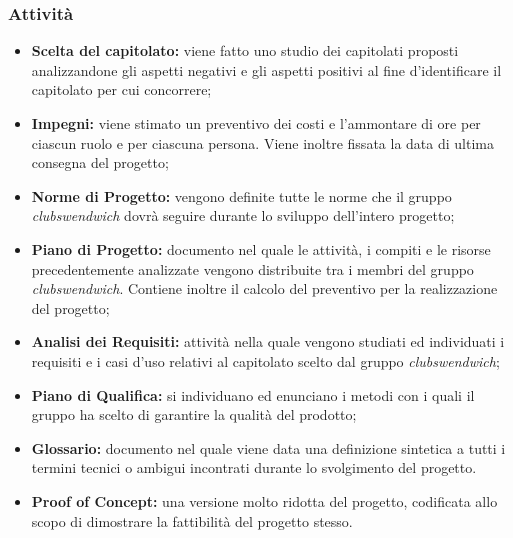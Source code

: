 \subsubsection{Attività}
\begin{itemize}
    \item \textbf{Scelta del capitolato:} viene fatto uno studio dei capitolati proposti analizzandone gli aspetti negativi e gli aspetti positivi al fine d'identificare il capitolato per cui concorrere;
    \item \textbf{Impegni:} viene stimato un preventivo dei costi e l'ammontare di ore per ciascun ruolo e per ciascuna persona. Viene inoltre fissata la data di ultima consegna del progetto;
    \item \textbf{Norme di Progetto:} vengono definite tutte le norme che il gruppo \textit{clubswendwich} dovrà seguire durante lo sviluppo dell'intero progetto;
    \item \textbf{Piano di Progetto:} documento nel quale le attività, i compiti e le risorse precedentemente analizzate vengono distribuite tra i membri del gruppo \textit{clubswendwich}. Contiene inoltre il calcolo del preventivo per la realizzazione del progetto;
    \item \textbf{Analisi dei Requisiti:} attività nella quale vengono studiati ed individuati i requisiti e i casi d'uso relativi al capitolato scelto dal gruppo \textit{clubswendwich};
    \item \textbf{Piano di Qualifica:} si individuano ed enunciano i metodi con i quali il gruppo ha scelto di garantire la qualità del prodotto;
    \item \textbf{Glossario:} documento nel quale viene data una definizione sintetica a tutti i termini tecnici o ambigui incontrati durante lo svolgimento del progetto.
    \item \textbf{Proof of Concept:} una versione molto ridotta del progetto, codificata allo scopo di dimostrare la fattibilità del progetto stesso.
\end{itemize}

